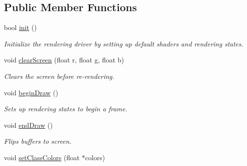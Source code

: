 \subsection*{Public Member Functions}
\begin{DoxyCompactItemize}
\item 
bool \hyperlink{class_lots_of_lines_1_1_open_g_l_renderer_a7f1cf064978a3e5f6869e54022c1d82e}{init} ()\hypertarget{class_lots_of_lines_1_1_open_g_l_renderer_a7f1cf064978a3e5f6869e54022c1d82e}{}\label{class_lots_of_lines_1_1_open_g_l_renderer_a7f1cf064978a3e5f6869e54022c1d82e}

\begin{DoxyCompactList}\small\item\em Initialize the rendering driver by setting up default shaders and rendering states. \end{DoxyCompactList}\item 
void \hyperlink{class_lots_of_lines_1_1_open_g_l_renderer_aff896e674c56136200222bce15ff8f26}{clear\+Screen} (float r, float g, float b)\hypertarget{class_lots_of_lines_1_1_open_g_l_renderer_aff896e674c56136200222bce15ff8f26}{}\label{class_lots_of_lines_1_1_open_g_l_renderer_aff896e674c56136200222bce15ff8f26}

\begin{DoxyCompactList}\small\item\em Clears the screen before re-\/rendering. \end{DoxyCompactList}\item 
void \hyperlink{class_lots_of_lines_1_1_open_g_l_renderer_a9c20e52e8c7f80d4fec614a25d507026}{begin\+Draw} ()\hypertarget{class_lots_of_lines_1_1_open_g_l_renderer_a9c20e52e8c7f80d4fec614a25d507026}{}\label{class_lots_of_lines_1_1_open_g_l_renderer_a9c20e52e8c7f80d4fec614a25d507026}

\begin{DoxyCompactList}\small\item\em Sets up rendering states to begin a frame. \end{DoxyCompactList}\item 
void \hyperlink{class_lots_of_lines_1_1_open_g_l_renderer_a57a1941507761fb0a3e12ca2a68b0066}{end\+Draw} ()\hypertarget{class_lots_of_lines_1_1_open_g_l_renderer_a57a1941507761fb0a3e12ca2a68b0066}{}\label{class_lots_of_lines_1_1_open_g_l_renderer_a57a1941507761fb0a3e12ca2a68b0066}

\begin{DoxyCompactList}\small\item\em Flips buffers to screen. \end{DoxyCompactList}\item 
void \hyperlink{class_lots_of_lines_1_1_open_g_l_renderer_aff310a706302b5961d6452451bcc9691}{set\+Class\+Colors} (float $\ast$colors)\hypertarget{class_lots_of_lines_1_1_open_g_l_renderer_aff310a706302b5961d6452451bcc9691}{}\label{class_lots_of_lines_1_1_open_g_l_renderer_aff310a706302b5961d6452451bcc9691}


\end{DoxyCompactItemize}

